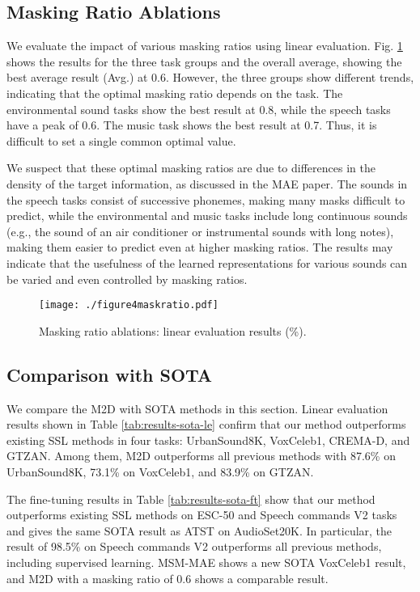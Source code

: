 \documentclass{article}
\begin{document}
\subsection{Masking Ratio Ablations} \label{exp:mask-ratio}
We evaluate the impact of various masking ratios using linear evaluation.
Fig. \ref{fig:mask-ratio-results} shows the results for the three task groups and the overall average, showing the best average result (Avg.) at 0.6.
However, the three groups show different trends, indicating that the optimal masking ratio depends on the task. The environmental sound tasks show the best result at 0.8, while the speech tasks have a peak of 0.6. The music task shows the best result at 0.7. Thus, it is difficult to set a single common optimal value.

We suspect that these optimal masking ratios are due to differences in the density of the target information, as discussed in the MAE paper.
The sounds in the speech tasks consist of successive phonemes, making many masks difficult to predict, while the environmental and music tasks include long continuous sounds (e.g., the sound of an air conditioner or instrumental sounds with long notes), making them easier to predict even at higher masking ratios.
The results may indicate that the usefulness of the learned representations for various sounds can be varied and even controlled by masking ratios.

\begin{figure}[htbp]
  \centering
  \texttt{[image: ./figure4maskratio.pdf]} 
  \caption{Masking ratio ablations: linear evaluation results (\%).}
  \label{fig:mask-ratio-results}
  \vspace{-10pt}
\end{figure}


\subsection{Comparison with SOTA} \label{exp:sota}
We compare the M2D with SOTA methods in this section.
Linear evaluation results shown in Table \ref{tab:results-sota-le} confirm that our method outperforms existing SSL methods in four tasks: UrbanSound8K, VoxCeleb1, CREMA-D, and GTZAN. Among them, M2D outperforms all previous methods with 87.6\% on UrbanSound8K, 73.1\% on VoxCeleb1, and 83.9\% on GTZAN.


The fine-tuning results in Table \ref{tab:results-sota-ft} show that our method outperforms existing SSL methods on ESC-50 and Speech commands V2 tasks and gives the same SOTA result as ATST\cite{Li2022ATST} on AudioSet20K. In particular, the result of 98.5\% on Speech commands V2 outperforms all previous methods, including supervised learning.
MSM-MAE\cite{niizumi2022msm-mae} shows a new SOTA VoxCeleb1 result, and M2D with a masking ratio of 0.6 shows a comparable result.
\end{document}
